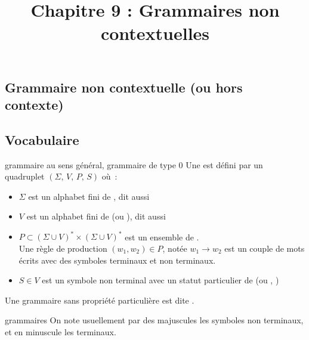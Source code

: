 

\begin{adjustwidth}{-3cm}{-3cm}

\setcounter{chapitre}{9}
\title{Chapitre 9 : Grammaires non contextuelles}
\maketitle

\section{Grammaire non contextuelle (ou hors contexte)}

\subsection{Vocabulaire}

\begin{definition}{}{grammaire au sens général, grammaire de type 0}
    Une  est défini par un quadruplet $(\Sigma,\,V,\,P,\,S)$ où~:
    \begin{itemize}
        \item $\Sigma$ est un alphabet fini de , dit aussi 
        \item $V$ est un alphabet fini de  (ou ), dit aussi 
        \item $P \subset (\Sigma \cup V)^* \times (\Sigma \cup V)^* $ est un ensemble de .\\
        Une règle de production $(w_1,w_2) \in P$, notée $w_1 \to w_2$ est un couple de mots écrits avec des symboles terminaux et non terminaux.
        \item $S \in V$ est un symbole non terminal avec un statut particulier de  (ou , )
    \end{itemize}
    Une grammaire sans propriété particulière est dite .
\end{definition}

\begin{remarque}{}{grammaires}
    On note usuellement par des majuscules les symboles non terminaux, et en minuscule les terminaux.
\end{remarque}


\end{adjustwidth}
